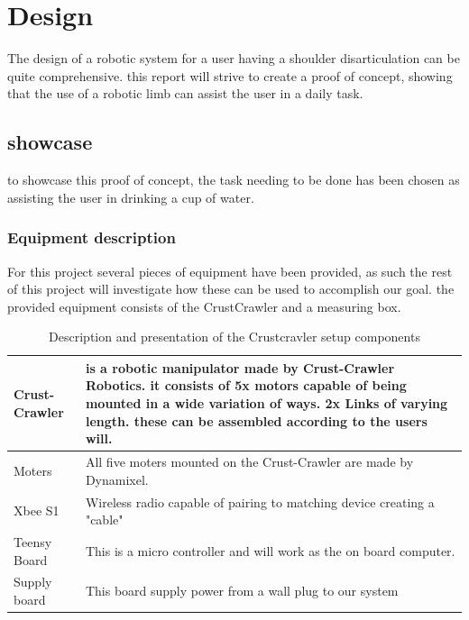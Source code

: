 \chapter{Design}\label{ch:Design} %
The design of a robotic system for a user having a shoulder disarticulation can be quite comprehensive. this report will strive to create a proof of concept, showing that the use of a robotic limb can assist the user in a daily task.

\section{showcase}
to showcase this proof of concept, the task needing to be done has been chosen as assisting the user in drinking a cup of water.

\subsection{Equipment description}
For this project several pieces of equipment have been provided, as such the rest of this project will investigate how these can be used to accomplish our goal. the provided equipment consists of the CrustCrawler and a measuring box.

\begin{table}[H]
\begin{tabular}{|P{3cm}||P{10cm}|}

\hline
\textbf{Crust-Crawler} & is a robotic manipulator made by Crust-Crawler Robotics.  it consists of 5x motors capable of being mounted in a wide variation of ways.  2x Links of varying length.  these can be assembled according to the users will. \\ \hline
Moters                 & All five moters mounted on the Crust-Crawler are made by Dynamixel.  \\ \hline
Xbee S1                   & Wireless radio capable of pairing to matching device creating a "cable" \\ \hline
Teensy Board              & This is a micro controller and will work as the on board computer.      \\ \hline
Supply  board             & This board supply power from a wall plug to our system                  \\ \hline
\end{tabular}%
\caption{Description and presentation of the Crustcravler setup components}
\label{tableCrust}
\end{table}

